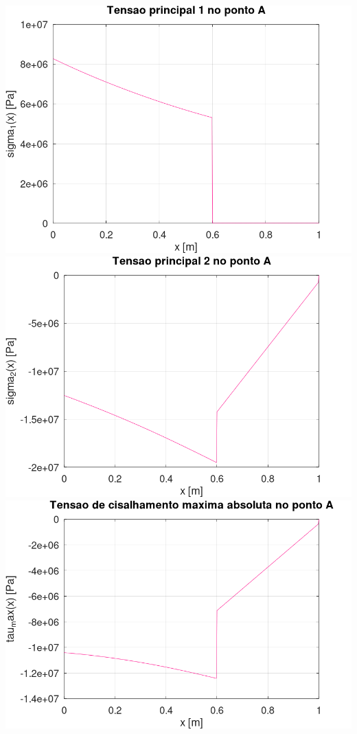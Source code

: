 \documentclass[10pt]{article}
\begin{document}
\begin{center}
    \includegraphics[scale=0.25]{figure12.png}
    \includegraphics[scale=0.25]{figure13.png}
    \includegraphics[scale=0.25]{figure14.png}

\end{center}
\end{document}
